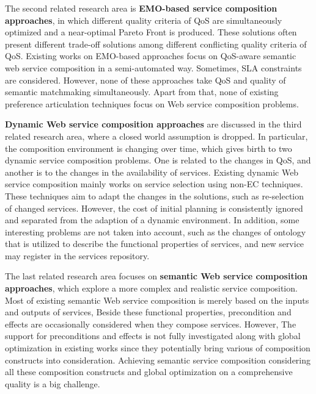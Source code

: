 
The second related research area is \textbf{EMO-based service composition approaches}, in which different quality criteria of QoS are simultaneously optimized and a near-optimal Pareto Front is produced. These solutions often present different trade-off solutions among different conflicting quality criteria of QoS. Existing works on EMO-based approaches focus on QoS-aware semantic web service composition in a semi-automated way. Sometimes, SLA constraints are considered. However, none of these approaches take QoS and quality of semantic matchmaking simultaneously. Apart from that, none of existing preference articulation techniques focus on Web service composition problems.

\textbf{Dynamic Web service composition approaches} are discussed in the third related research area, where a closed world assumption is dropped. In particular, the composition environment is changing over time, which gives birth to two dynamic service composition problems. One is related to the changes in QoS, and another is to the changes in the availability of services. Existing dynamic Web service composition mainly works on service selection using non-EC techniques. These techniques aim to adapt the changes in the solutions, such as re-selection of changed services. However, the cost of initial planning is consistently ignored and separated from the adaption of a dynamic environment. In addition, some interesting problems are not taken into account, such as the changes of ontology that is utilized to describe the functional properties of services,  and new service may register in the services repository.

The last related research area focuses on \textbf{semantic Web service composition approaches}, which explore a more complex and realistic service composition. Most of existing semantic Web service composition is merely based on the inputs and outputs of services, Beside these functional properties,  precondition and effects are occasionally considered when they compose services. However,   The support for preconditions and effects is not fully investigated along with global optimization in existing works since they potentially bring various of composition constructs into consideration. Achieving semantic service composition considering all these composition constructs and global optimization on a comprehensive quality is a big challenge.


